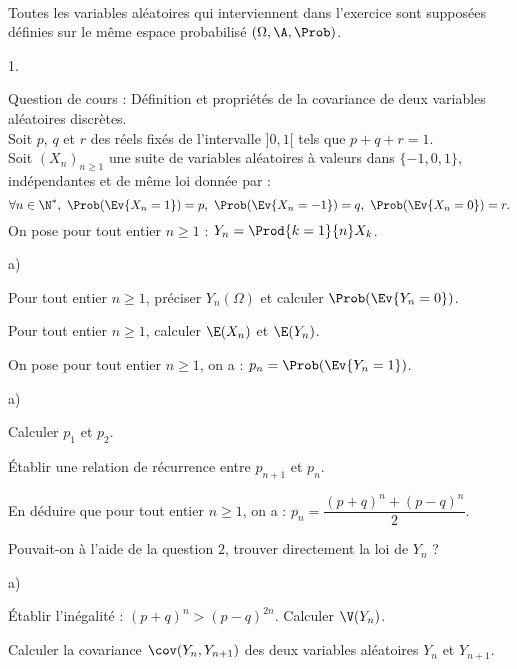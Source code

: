\begin{exerciceAP}~\\
Toutes les variables aléatoires qui interviennent dans l'exercice sont 
supposées définies sur le même espace probabilisé 
$(\Omega,\A,\Prob)$.
\begin{noliste}{1.}
    \setlength{\itemsep}{2mm}
  \item Question de cours : Définition et propriétés de la covariance 
  de deux variables aléatoires discrètes.\\
  Soit $p$, $q$ et $r$ des réels fixés de l'intervalle $]0,1[$ tels que 
  $p+q+r=1$. \\
  Soit $(X_n)_{n\geq 1}$ une suite de variables aléatoires à 
  valeurs dans $\{-1,0,1\}$, indépendantes et de même loi donnée par :
  \[
    \forall n \in\N^*, \ \Prob(\Ev{X_n=1})=p, \ \Prob(\Ev{X_n=-1})=q, \ 
    \Prob(\Ev{X_n=0})=r.
  \]
  On pose pour tout entier $n\geq 1$ : $Y_n=\Prod{k=1}{n} X_k$.
  
  \item 
  \begin{noliste}{a)}
    \setlength{\itemsep}{2mm}
    \item Pour tout entier $n\geq 1$, préciser $Y_n(\Omega)$ et 
    calculer $\Prob(\Ev{Y_n=0})$.
    
    \item Pour tout entier $n\geq 1$, calculer $\E(X_n)$ et $\E(Y_n)$.
  \end{noliste}
  
  \item On pose pour tout entier $n\geq 1$, on a : 
  $p_n=\Prob(\Ev{Y_n=1})$.
  \begin{noliste}{a)}
    \setlength{\itemsep}{2mm}
    \item Calculer $p_1$ et $p_2$.
    
    \item Établir une relation de récurrence entre $p_{n+1}$ et 
    $p_n$.
    
    \item En déduire que pour tout entier $n\geq 1$, on a : 
    $p_n=\dfrac{(p+q)^n +(p-q)^n}{2}$.
    
    \item Pouvait-on à l'aide de la question $2$, trouver 
    directement la loi de $Y_n$ ?
  \end{noliste}
  
  \item 
  \begin{noliste}{a)}
    \setlength{\itemsep}{2mm}
    \item Établir l'inégalité : $(p+q)^n > (p-q)^{2n}$. Calculer 
    $\V(Y_n)$.
    
    \item Calculer la covariance $\cov(Y_n,Y_{n+1})$ des deux 
    variables aléatoires $Y_n$ et $Y_{n+1}$.
  \end{noliste}
\end{noliste}
\end{exerciceAP} 



